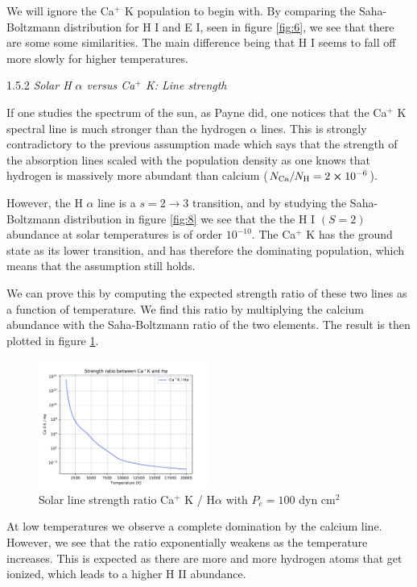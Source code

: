 \documentclass[a4paper,11.5pt,]{article}
\begin{document}
\begin{multicols}{2}
\noindent We will ignore the Ca$^+$ K population to begin with. By comparing the Saha-Boltzmann distribution for H I and E I, seen in figure \ref{fig:6}, we see that there are some some similarities. The main difference being that H I seems to fall off more slowly for higher temperatures.

\begin{center}
1.5.2\textit{ Solar H $\alpha$ versus Ca$^+$ K: Line strength}
\end{center}
If one studies the spectrum of the sun, as Payne did, one notices that the Ca$^+$ K spectral line is much stronger than the hydrogen $\alpha$ lines. This is strongly contradictory to the previous assumption made which says that the strength of the absorption lines scaled with the population density as one knows that hydrogen is massively more abundant than calcium ($N_\text{Ca}/N_\text{H} = 2 \cross 10^{-6}$). 

However, the H $\alpha$ line is a $s = 2 \rightarrow 3$ transition, and by studying the Saha-Boltzmann distribution in figure \ref{fig:8} we see that the the H I $(S=2)$ abundance at solar temperatures is of order $10^{-10}$. The Ca$^+$ K has the ground state as its lower transition, and has therefore the dominating population, which means that the assumption still holds.

We can prove this by computing the expected strength ratio of these two lines as a function of temperature. We find this ratio by multiplying the calcium abundance with the Saha-Boltzmann ratio of the two elements. The result is then plotted in figure \ref{fig:9}. 

\begin{figure}[H]
	\centering
	\includegraphics[width=0.5\textwidth]{SSA/figures/strengthratio.pdf}
	\caption{Solar line strength ratio Ca$^+$ K / H$\alpha$ with $P_e = 100$ dyn cm$^2$ }
	\label{fig:9}
\end{figure}

\noindent At low temperatures we observe a complete domination by the calcium line. However, we see that the ratio exponentially weakens as the temperature increases. This is expected as there are more and more hydrogen atoms that get ionized, which leads to a higher H II abundance. 


\end{multicols}
\end{document}
